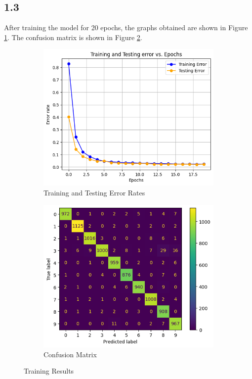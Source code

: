 \documentclass{article}
\begin{document}
\subsection{1.3}
After training the model for 20 epochs, the graphs obtained are shown in Figure \ref{fig:1}.
The confusion matrix is shown in Figure \ref{fig:2}.
\begin{figure}[h]
    \centering
    \begin{subfigure}{.48\textwidth}
        \centering
        \includegraphics[width=\textwidth]{Assets/graph.png}
        \caption{Training and Testing Error Rates}
        \label{fig:1}
    \end{subfigure}
    \hfill
    \begin{subfigure}{.48\textwidth}
        \centering
        \includegraphics[width=\textwidth]{Assets/confusion-mat.png}
        \caption{Confusion Matrix}
        \label{fig:2}
    \end{subfigure}
    \caption{Training Results}
    \label{fig:results}
\end{figure}
\end{document}
